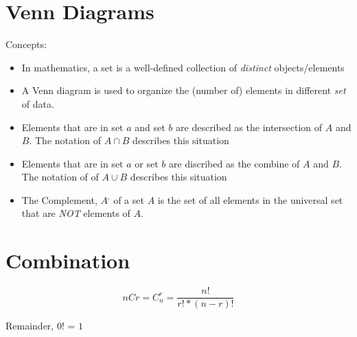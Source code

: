 \documentclass[11pt]{report}
\theoremstyle{remark}
\begin{document}
\section{Venn Diagrams}
Concepts:
\begin{itemize}
    \item In mathematics, a set is a well-defined collection of \textit{distinct} objects/elements
    \item A Venn diagram is used to organize the (number of) elements in different \textit{set} of data.
    \item Elements that are in set $a$ and set $b$ are described as the intersection of $A$ and $B$. The notation of $A \cap B$ describes this situation
    \item Elements that are in set $a$ or set $b$ are discribed as the combine of $A$ and $B$. The notation of of $A\cup B$ describes this situation
    \item The Complement, $A^{,}$ of a set $A$ is the set of all elements in the universal set that are \textit{NOT} elements of $A$.
\end{itemize}

\section{Combination}
\[
    nCr = C_{n}^r = \frac{n!}{r! * (n - r)!}
\]
\begin{center}
    Remainder, $0!$ = \textbf{$1$}
\end{center}
\end{document}

